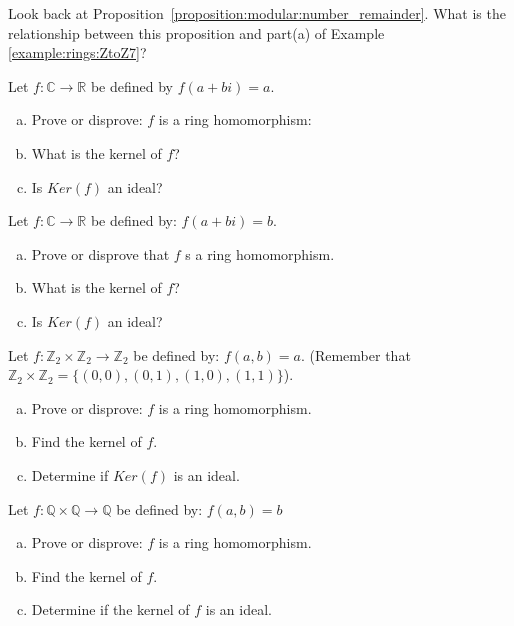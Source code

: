 \begin{exercise}
Look back at Proposition~\ref{proposition:modular:number_remainder}.   What is the relationship between this proposition and part(a) of Example \ref{example:rings:ZtoZ7}?
\end{exercise}

\begin{exercise}\label{exercise:rings:complexHomoKer}
Let $f:{\mathbb C}\rightarrow {\mathbb R}$ be defined by $f(a+bi)=a$.

\begin{enumerate}[(a)]
\item Prove or disprove: $f$ is a ring homomorphism:
\item What is the kernel of $f$?
\item Is $Ker(f)$ an ideal?
\end{enumerate}

\end{exercise}

\begin{exercise}
Let $f:{\mathbb C}\rightarrow {\mathbb R}$ be defined by: $f(a+bi)=b$.
\begin{enumerate}[(a)]
\item Prove or disprove that $f$ s a ring homomorphism.
\item What is the kernel of $f$?
\item Is $Ker(f)$ an ideal?
\end{enumerate}
\end{exercise}

\begin{exercise}
Let $f:{\mathbb Z}_2\times {\mathbb Z}_2\rightarrow {\mathbb Z}_2$ be defined by: $f(a,b)=a$.  (Remember that ${\mathbb Z}_2\times{\mathbb Z}_2=\{(0,0),(0,1),(1,0),(1,1)\}$).
\begin{enumerate}[(a)]
\item Prove or disprove: $f$ is a ring homomorphism.
\item Find the kernel of $f$.
\item Determine if $Ker(f)$ is an ideal.
\end{enumerate}
\end{exercise}
\begin{exercise}
Let $f:{\mathbb Q}\times {\mathbb Q}\rightarrow {\mathbb Q}$ be defined by: $f(a,b)=b$
\begin{enumerate}[(a)]
\item Prove or disprove: $f$ is a ring homomorphism.
\item Find the kernel of $f$.
\item Determine if the kernel of $f$ is an ideal.
\end{enumerate}
\end{exercise}

